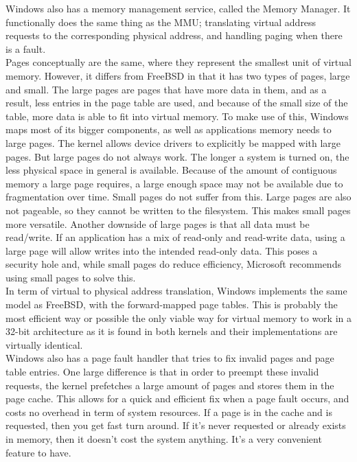 \documentclass[titlepage]{article}
\begin{document}
\begin{singlespace}
 


Windows also has a memory management service, called the Memory Manager. It functionally does the same thing as the MMU; translating virtual address requests to the corresponding physical address, and handling paging when there is a fault. \\
    Pages conceptually are the same, where they represent the smallest unit of virtual memory. However, it differs from FreeBSD in that it has two types of pages, large and small. The large pages are pages that have more data in them, and as a result, less entries in the page table are used, and because of the small size of the table, more data is able to fit into virtual memory. To make use of this, Windows maps most of its bigger components, as well as applications memory needs to large pages. The kernel allows device drivers to explicitly be mapped with large pages. But large pages do not always work. The longer a system is turned on, the less physical space in general is available. Because of the amount of contiguous memory a large page requires, a large enough space may not be available due to fragmentation over time. Small pages do not suffer from this. Large pages are also not pageable, so they cannot be written to the filesystem. This makes small pages more versatile. Another downside of large pages is that all data must be read/write. If an application has a mix of read-only and read-write data, using a large page will allow writes into the intended read-only data. This poses a security hole and, while small pages do reduce efficiency, Microsoft recommends using small pages to solve this.    \\
    In term of virtual to physical address translation, Windows implements the same model as FreeBSD, with the forward-mapped page tables. This is probably the most efficient way or possible the only viable way for virtual memory to work in a 32-bit architecture as it is found in both kernels and their implementations are virtually identical. \\
    Windows also has a page fault handler that tries to fix invalid pages and page table entries. One large difference is that in order to preempt these invalid requests, the kernel prefetches a large amount of pages and stores them in the page cache. This allows for a quick and efficient fix when a page fault occurs, and costs no overhead in term of system resources. If a page is in the cache and is requested, then you get fast turn around. If it's never requested or already exists in memory, then it doesn’t cost the system anything. It’s a very convenient feature to have. \cite{windowsch10}\\

\end{singlespace}
\end{document}
